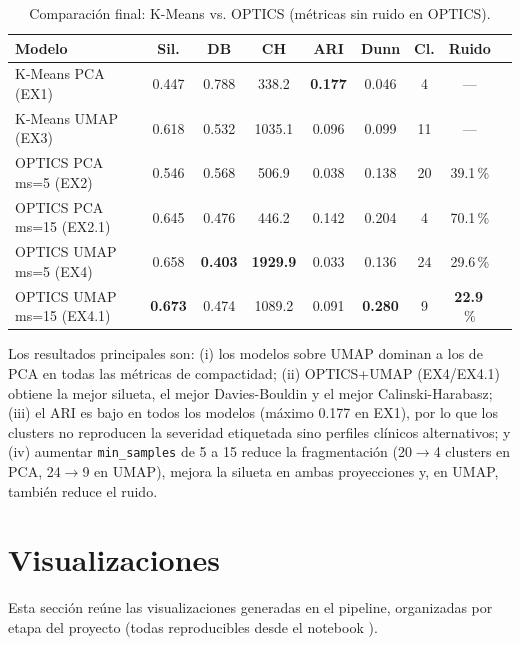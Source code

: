 \documentclass[11pt,a4paper]{article}
\begin{document}
\begin{table}[H]
  \centering
  \caption{Comparación final: K-Means vs. OPTICS (métricas sin ruido en OPTICS).}
  \label{tab:comparacion}
  \footnotesize
  \begin{tabular}{@{}lcccccccc@{}}
    \toprule
    \textbf{Modelo} & \textbf{Sil.} & \textbf{DB} & \textbf{CH} & \textbf{ARI} & \textbf{Dunn} & \textbf{Cl.} & \textbf{Ruido} \\
    \midrule
    K-Means PCA (EX1) & 0.447 & 0.788 & 338.2 & \textbf{0.177} & 0.046 & 4 & --- \\
    K-Means UMAP (EX3) & 0.618 & 0.532 & 1035.1 & 0.096 & 0.099 & 11 & --- \\
    OPTICS PCA ms=5 (EX2) & 0.546 & 0.568 & 506.9 & 0.038 & 0.138 & 20 & 39.1\,\% \\
    OPTICS PCA ms=15 (EX2.1) & 0.645 & 0.476 & 446.2 & 0.142 & 0.204 & 4 & 70.1\,\% \\
    OPTICS UMAP ms=5 (EX4) & 0.658 & \textbf{0.403} & \textbf{1929.9} & 0.033 & 0.136 & 24 & 29.6\,\% \\
    OPTICS UMAP ms=15 (EX4.1) & \textbf{0.673} & 0.474 & 1089.2 & 0.091 & \textbf{0.280} & 9 & \textbf{22.9}\,\% \\
    \bottomrule
  \end{tabular}
\end{table}

Los resultados principales son: (i) los modelos sobre UMAP dominan a los de PCA en todas las
métricas de compactidad; (ii) OPTICS+UMAP (EX4/EX4.1) obtiene la mejor silueta, el mejor
Davies-Bouldin y el mejor Calinski-Harabasz; (iii) el ARI es bajo en todos los modelos
(máximo 0.177 en EX1), por lo que los clusters no reproducen la severidad etiquetada sino
perfiles clínicos alternativos; y (iv) aumentar \texttt{min\_samples} de 5 a 15 reduce la
fragmentación (20$\rightarrow$4 clusters en PCA, 24$\rightarrow$9 en UMAP), mejora la silueta
en ambas proyecciones y, en UMAP, también reduce el ruido.

\section{Visualizaciones}\label{sec:visualizaciones}

Esta sección reúne las visualizaciones generadas en el pipeline, organizadas por etapa del
proyecto (todas reproducibles desde el notebook \cite{notebook}).
\end{document}
